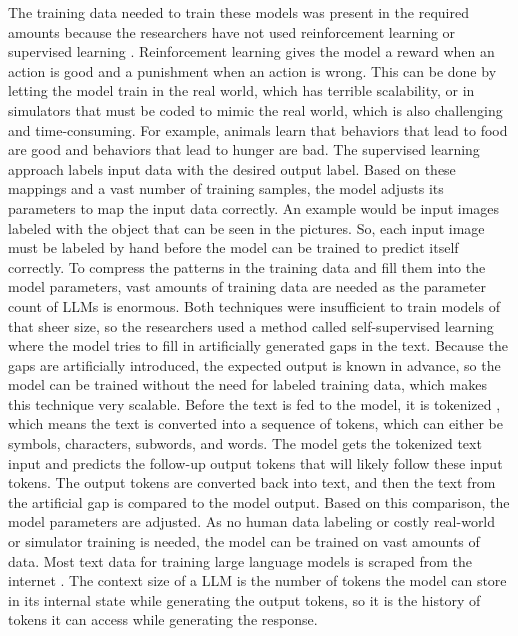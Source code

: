 \documentclass[draft,final]{thesisclass} %
\begin{document}
The training data needed to train these models was present in the required amounts because the researchers have not used reinforcement learning \parencite{rl_bible} or supervised learning \parencite[3]{sl_bible}.
Reinforcement learning gives the model a reward when an action is good and a punishment when an action is wrong. This can be done by letting the model train in the real world, which has terrible scalability, or in simulators that must be coded to mimic the real world, which is also challenging and time-consuming.
For example, animals learn that behaviors that lead to food are good and behaviors that lead to hunger are bad.
The supervised learning approach labels input data with the desired output label. Based on these mappings and a vast number of training samples, the model adjusts its parameters to map the input data correctly.
An example would be input images labeled with the object that can be seen in the pictures. So, each input image must be labeled by hand before the model can be trained to predict itself correctly.
To compress the patterns in the training data and fill them into the model parameters, vast amounts of training data are needed as the parameter count of \gls{LLM}s is enormous.
Both techniques were insufficient to train models of that sheer size, so the researchers used a method called self-supervised learning \parencite[7]{llm_literature_review} where the model tries to fill in artificially generated gaps in the text.
Because the gaps are artificially introduced, the expected output is known in advance, so the model can be trained without the need for labeled training data, which makes this technique very scalable.
Before the text is fed to the model, it is tokenized \parencite[4]{llm_literature_review}, which means the text is converted into a sequence of tokens, which can either be symbols, characters, subwords, and words.
The model gets the tokenized text input and predicts the follow-up output tokens that will likely follow these input tokens. The output tokens are converted back into text, and then the text from the artificial gap is compared to the model output.
Based on this comparison, the model parameters are adjusted. As no human data labeling or costly real-world or simulator training is needed, the model can be trained on vast amounts of data.
Most text data for training large language models is scraped from the internet \parencite[1]{llm_literature_review}.
The context size of a \gls{LLM} is the number of tokens the model can store in its internal state while generating the output tokens, so it is the history of tokens it can access while generating the response.
\end{document}
